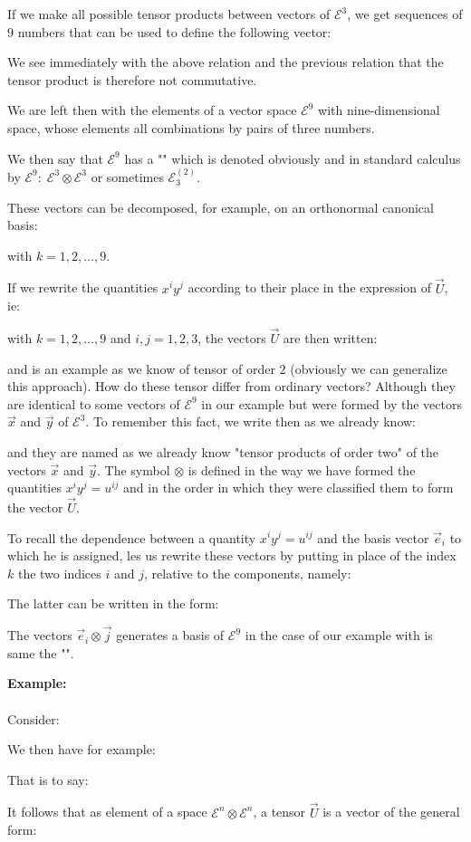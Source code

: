 	If we make all possible tensor products between vectors of $\mathcal{E}^3$, we get sequences of $9$ numbers that can be used to define the following vector:
		
	\begin{tcolorbox}[title=Remark,colframe=black,arc=10pt]
	We see immediately with the above relation and the previous relation that the tensor product is therefore not commutative.
	\end{tcolorbox}
	We are left then with the elements of a vector space $\mathcal{E}^9$ with nine-dimensional space, whose elements all combinations by pairs of three numbers.
	
	We then say that $\mathcal{E}^9$ has a "" which is denoted obviously and in standard calculus by $\mathcal{E}^9:\; \mathcal{E}^3\otimes \mathcal{E}^3$ or sometimes $\mathcal{E}_3^{(2)}$.

	These vectors can be decomposed, for example, on an orthonormal canonical basis:
	
	with $k=1,2,\ldots,9$.

	If we rewrite the quantities $x^iy^j$ according to their place in the expression of $\vec{U}$, ie:
	
	with $k=1,2,\ldots,9$ and $i,j=1,2,3$, the vectors $\vec{U}$ are then written:
	
	and is an example as we know of tensor of order $2$ (obviously we can generalize this approach).
	How do these tensor differ from ordinary vectors? Although they are identical to some vectors of $\mathcal{E}^9$ in our example but were formed by the vectors $\vec{x}$ and $\vec{y}$ of $\mathcal{E}^3$. To remember this fact, we write then as we already know:
	
	and they are named as we already know "tensor products of order two" of the vectors $\vec{x}$ and $\vec{y}$. The symbol $\otimes$ is defined in the way we have formed the quantities $x^iy^j=u^{ij}$ and in the order in which they were classified them to form the vector $\vec{U}$.

	To recall the dependence between a quantity $x^iy^j=u^{ij}$ and the basis vector $\vec{e}_i$ to which he is assigned, les us rewrite these vectors by putting in place of the index $k$ the two indices $i$ and $j$, relative to the components, namely:
	
	The latter can be written in the form:
	
	The vectors $\vec{e}_i\otimes\vec{j}$ generates a basis of $\mathcal{E}^9$ in the case of our example with is same the "".
	\begin{tcolorbox}[colframe=black,colback=white,sharp corners]
	\textbf{{\Large {}}Example:}\\\\
	Consider:
	
	We then have for example:
	
	That is to say:
	
	\end{tcolorbox}
	It follows that as element of a space $\mathcal{E}^n\otimes \mathcal{E}^n$, a tensor $\vec{U}$ is a vector of the general form:
	
